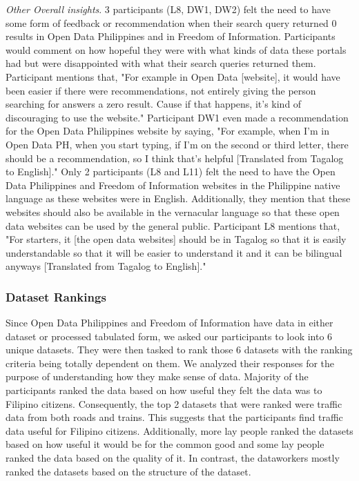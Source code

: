 \documentclass{sigchi}
\begin{document}
\textit{Other Overall insights}. 3 participants (L8, DW1, DW2) felt the need to have some form of feedback or recommendation when their search query returned 0 results in Open Data Philippines and in Freedom of Information. Participants would comment on how hopeful they were with what kinds of data these portals had but were disappointed with what their search queries returned them. Participant mentions that, "For example in Open Data [website], it would have been easier if there were recommendations, not entirely giving the person searching for answers a zero result. Cause if that happens, it's kind of discouraging to use the website." Participant DW1 even made a recommendation for the Open Data Philippines website by saying, "For example, when I'm in Open Data PH, when you start typing, if I'm on the second or third letter, there should be a recommendation, so I think that's helpful [Translated from Tagalog to English]." Only 2 participants (L8 and L11) felt the need to have the Open Data Philippines and Freedom of Information websites in the Philippine native language as these websites were in English. Additionally, they mention that these websites should also be available in the vernacular language so that these open data websites can be used by the general public. Participant L8 mentions that, "For starters, it [the open data websites] should be in Tagalog so that it is easily understandable so that it will be easier to understand it and it can be bilingual anyways [Translated from Tagalog to English]."

\subsubsection{Dataset Rankings}
Since Open Data Philippines and Freedom of Information have data in either dataset or processed tabulated form, we asked our participants to look into 6 unique datasets. They were then tasked to rank those 6 datasets with the ranking criteria being totally dependent on them. We analyzed their responses for the purpose of understanding how they make sense of data. Majority of the participants ranked the data based on how useful they felt the data was to Filipino citizens. Consequently, the top 2 datasets that were ranked were traffic data from both roads and trains. This suggests that the participants find traffic data useful for Filipino citizens. Additionally, more lay people ranked the datasets based on how useful it would be for the common good and some lay people ranked the data based on the quality of it. In contrast, the dataworkers mostly ranked the datasets based on the structure of the dataset.
\end{document}
